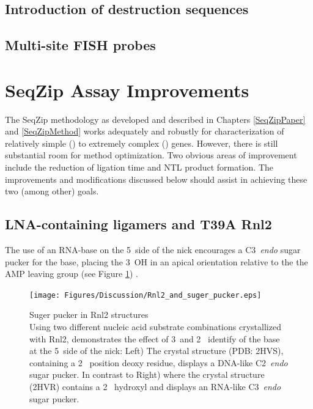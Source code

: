   \subsection{Introduction of destruction sequences}\label{Disc:subsec:Intro of Desctruction Sequences}


  \subsection{Multi-site FISH probes}\label{Disc:subsec:Multi-site FISH probes}


\section{SeqZip Assay Improvements}
  \label{Disc:sec:SeqZip Improvements}

  The SeqZip methodology as developed and described in Chapters \ref{SeqZipPaper} and \ref{SeqZipMethod} works adequately and robustly for characterization of relatively simple (\cd{}) to extremely complex (\dscam{}) genes. However, there is still substantial room for method optimization. Two obvious areas of improvement include the reduction of ligation time and NTL product formation. The improvements and modifications discussed below should assist in achieving these two (among other) goals.

  \subsection{LNA-containing ligamers and T39A Rnl2}
    \label{Disc:subsec:LNA-Containing ligamers and T39A Rnk2}

    The use of an RNA-base on the 5\textprime~side of the nick encourages a C3\textprime~\textit{endo} sugar pucker for the base, placing the 3\textprime~OH in an apical orientation relative to the the AMP leaving group (see Figure \ref{Disc:fig:Rnl2 and suger pucker}) \citep{Nandakumar2006}.

    \begin{figure} %
      \centering 
      \texttt{[image: Figures/Discussion/Rnl2\_and\_suger\_pucker.eps]}
      \caption[Suger pucker in Rnl2 structures]
      {Suger pucker in Rnl2 structures \\[0.25cm]
        Using two different nucleic acid substrate combinations crystallized with Rnl2, \citet{Nandakumar2006} demonstrates the effect of 3\textprime~and 2\textprime~ identify of the base at the 5\textprime~side of the nick: Left) The crystal structure (PDB: 2HVS), containing a 2\textprime~ position deoxy residue, displays a DNA-like C2\textprime~\textit{endo} sugar pucker. In contrast to Right) where the crystal structure (2HVR) contains a 2\textprime~ hydroxyl and displays an RNA-like C3\textprime~\textit{endo} sugar pucker.
        }
        \label{Disc:fig:Rnl2 and suger pucker}
        \end{figure}

